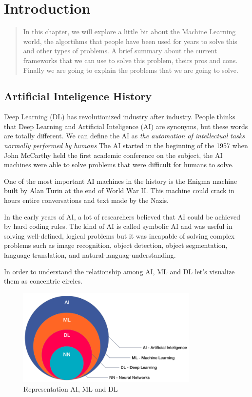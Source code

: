 \chapter{Introduction}

\begin{abstract}
In this chapter, we will explore a little bit about the 
Machine Learning world, the algortihms that people have
been used for years to solve this and other types of problems. A brief summary about the current frameworks that we can use to solve this problem, theirs pros and cons. Finally we are going to explain the problems that we are going to solve. 
\end{abstract}

\section{Artificial Inteligence History}

Deep Learning (DL) has revolutionized industry after industry. People thinks that Deep Learning and Artificial Inteligence (AI) are synonyms, but these words are totally different.
We can define the AI as \emph{the automation of intellectual tasks normally performed by humans}
The AI started in the beginning of the 1957 when John McCarthy held the first academic conference on the subject, the AI machines were able to solve problems that were difficult for humans to solve.

One of the most important AI machines in the history is the Enigma machine built by Alan Turin at the end of World War II. 
This machine could crack in hours entire conversations and text made by the Nazis.

In the early years of AI, a lot of researchers believed that AI could be achieved by hard coding rules. The kind of AI is called symbolic AI and was useful in solving well-defined, logical problems but it was incapable of solving complex problems such as image recognition, object detection, object segmentation, language translation, and natural-languag-understanding.

In order to understand the relationship among AI, ML and DL let's visualize them as concentric circles.


\begin{figure}[H]
\centering
\includegraphics[width=0.8\textwidth]{./figures/ai-ml-dl}
\caption{Representation AI, ML and DL \cite{ai-ml-dl-image}}
\end{figure}

